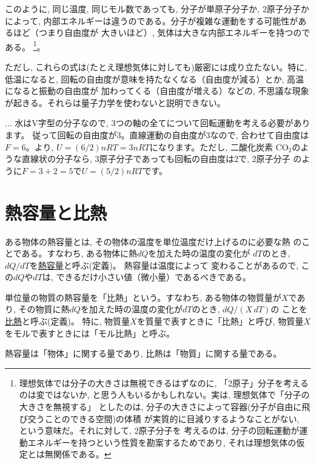 このように, 同じ温度, 同じモル数であっても, 分子が単原子分子か, 2原子分子かによって, 
内部エネルギーは違うのである。分子が複雑な運動をする可能性があるほど（つまり自由度が
大きいほど）, 気体は大きな内部エネルギーを持つのである。
\footnote{理想気体では分子の大きさは無視できるはずなのに, 「2原子」分子を考える
のは変ではないか, と思う人もいるかもしれない。実は, 理想気体で「分子の大きさを無視する」
としたのは, 分子の大きさによって容器(分子が自由に飛び交うことのできる空間)の体積
が実質的に目減りするようなことがない, という意味だ。それに対して, 2原子分子を
考えるのは, 分子の回転運動が運動エネルギーを持つという性質を勘案するためであり, 
それは理想気体の仮定とは無関係である。}。

ただし, これらの式は(たとえ理想気体に対しても)厳密には成り立たない。特に, 低温になると, 
回転の自由度が意味を持たなくなる（自由度が減る）とか, 高温になると振動の自由度が
加わってくる（自由度が増える）などの, 不思議な現象が起きる。それらは量子力学を使わないと説明できない。

\begin{faq}{\small{} ... 
水はV字型の分子なので, 3つの軸の全てについて回転運動を考える必要があります。
従って回転の自由度が3。直線運動の自由度が3なので, 合わせて自由度は$F=6$。より, $U=(6/2)nRT=3nRT$になります。ただし, 二酸化炭素
CO$_2$のような直線状の分子なら, 3原子分子であっても回転の自由度は2で, 2原子分子
のように$F=3+2=5$で$U=(5/2)nRT$です。}\end{faq}
\mv


\section{熱容量と比熱}

ある物体の熱容量とは, その物体の温度を単位温度だけ上げるのに必要な熱
のことである。すなわち, ある物体に熱$dQ$を加えた時の温度の変化が
$dT$のとき, $dQ/dT$を\underline{熱容量}と呼ぶ(定義)。
熱容量は温度によって
変わることがあるので, この$dQ$や$dT$は, できるだけ小さい値（微小量）であるべきである。

単位量の物質の熱容量を「比熱」という。すなわち, ある物体の物質量が$X$であり, 
その物質に熱$dQ$を加えた時の温度の変化が$dT$のとき, $dQ/(X\,dT)$の
ことを\underline{比熱}と呼ぶ(定義)。
特に, 物質量$X$を質量で表すときに「比熱」と呼び, 
物質量$X$をモルで表すときには「モル比熱」と呼ぶ。

熱容量は「物体」に関する量であり, 比熱は「物質」に関する量である。

